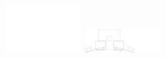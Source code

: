 \documentclass[aspectratio=43]{beamer}
\begin{document}
\begin{frame}[plain,t]
\vspace{100pt}
\centering
\includegraphics[width=0.25\textwidth]{Images/logo_uam-white.png}
\includegraphics[width=0.25\textwidth]{Images/logo_eps-white.png}
\end{frame}
\end{document}
